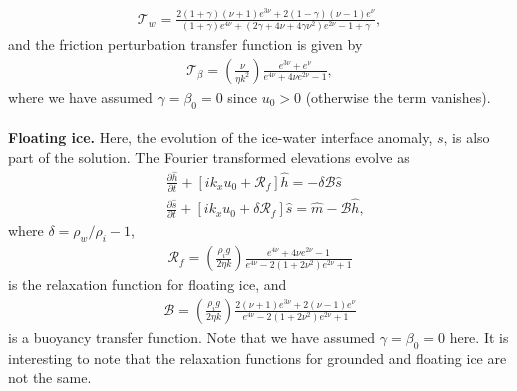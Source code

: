 \documentclass[paper=a4, fontsize=11pt]{article}
\begin{document}
\begin{align}
\mathcal{T}_w = \frac{2(1+\gamma)(\nu+1)e^{3\nu}+2(1-\gamma)(\nu-1)e^{\nu}  }{(1+\gamma)e^{4\nu} + (2\gamma+4\nu+4\gamma\nu^2)e^{2\nu} -1 + \gamma },
\end{align}
and the friction perturbation transfer function is given by
\begin{align}
\mathcal{T}_{\beta} =  \left(\frac{\nu}{\eta k^2}\right) \frac{e^{3\nu} + e^{\nu}}{e^{4\nu} +4\nu e^{2\nu} -1 },
\end{align}
where we have assumed $\gamma=\beta_0=0$  since $u_0>0$ (otherwise the term vanishes).
\\ \\
\textbf{Floating ice.} Here, the evolution of the ice-water interface anomaly, $s$,
is also part of the solution.
The Fourier transformed elevations evolve as
\begin{align}
&\frac{\partial \widehat{h}}{\partial t}+ \left[ik_xu_0  + \mathcal{R}_f\right]\widehat{h} = -\delta\mathcal{B}\widehat{s}\label{hf}\\
&\frac{\partial \widehat{s}}{\partial t}+ [ik_xu_0 + \delta\mathcal{R}_f]\widehat{s} = \widehat{m} - \mathcal{B} \widehat{h}, \label{sf}
\end{align}
where $\delta = \rho_w/\rho_i -1$,
\begin{align}
\mathcal{R}_f = \left(\frac{\rho_i g}{2\eta k}\right) \frac{e^{4\nu} +4\nu e^{2\nu} -1 }{e^{4\nu} -2(1+2\nu^2)e^{2\nu} +1} \label{Rf}
\end{align}
is the relaxation function for floating ice, and
\begin{align}
\mathcal{B} = \left(\frac{\rho_i g}{2\eta k}\right) \frac{ 2(\nu+1)e^{3\nu}+2(\nu-1)e^{\nu} }{e^{4\nu} -2(1+2\nu^2)e^{2\nu} +1} \label{B}
\end{align}
is a buoyancy transfer function. Note that we have assumed $\gamma=\beta_0=0$ here.
It is interesting to note that the relaxation functions for grounded and floating
ice are not the same.
\end{document}
